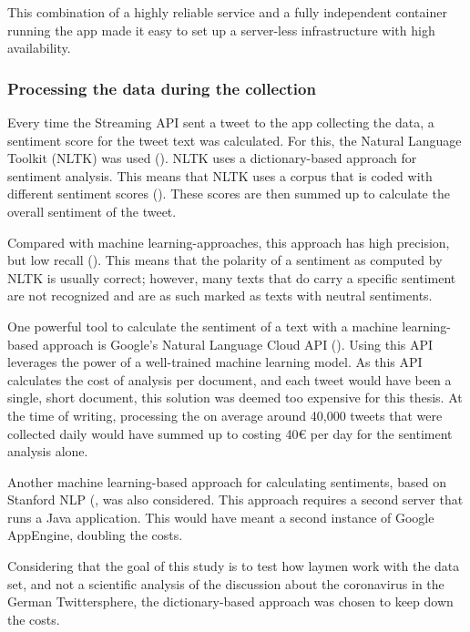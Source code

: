 This combination of a highly reliable service and a fully independent container running the app made it easy to set up a server-less infrastructure with high availability.

\subsubsection{Processing the data during the collection}
Every time the Streaming API sent a tweet to the app collecting the data, a sentiment score for the tweet text was calculated. For this, the Natural Language Toolkit (NLTK) was used (\cite{loper2002nltk}). NLTK uses a dictionary-based approach for sentiment analysis. This means that NLTK uses a corpus that is coded with different sentiment scores (\cite{haselmayer2017sentiment}). These scores are then summed up to calculate the overall sentiment of the tweet.

Compared with machine learning-approaches, this approach has high precision, but low recall (\cite{sorokaBadNewsMad2015}). This means that the polarity of a sentiment as computed by NLTK is usually correct; however, many texts that do carry a specific sentiment are not recognized and are as such marked as texts with neutral sentiments.

One powerful tool to calculate the sentiment of a text with a machine learning-based approach is Google's Natural Language Cloud API (\cite{googleSentimentAnalysisTutorial2020}). Using this API leverages the power of a well-trained machine learning model. As this API calculates the cost of analysis per document, and each tweet would have been a single, short document, this solution was deemed too expensive for this thesis. At the time of writing, processing the on average around 40,000 tweets that were collected daily would have summed up to costing 40€ per day for the sentiment analysis alone.

Another machine learning-based approach for calculating sentiments, based on Stanford NLP (\cite{stanfordnaturallanguageprocessinggroupSoftwareStanfordNatural}, was also considered. This approach requires a second server that runs a Java application. This would have meant a second instance of Google AppEngine, doubling the costs.

Considering that the goal of this study is to test how laymen work with the data set, and not a scientific analysis of the discussion about the coronavirus in the German Twittersphere, the dictionary-based approach was chosen to keep down the costs.

